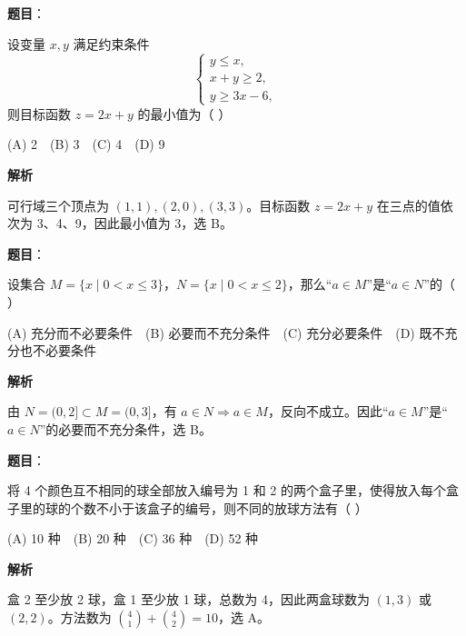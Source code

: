 \begin{answer}

\textbf{题目}：

设变量 \(x,y\) 满足约束条件
\nopagebreak[4]
\[
\begin{cases}
y\leq x,\\
x+y\geq 2,\\
y\geq 3x-6,
\end{cases}
\]
则目标函数 \(z=2x+y\) 的最小值为（  ）

(A) 2　(B) 3　(C) 4　(D) 9

\textbf{解析}

可行域三个顶点为 \((1,1),(2,0),(3,3)\)。目标函数 \(z=2x+y\) 在三点的值依次为 3、4、9，因此最小值为 3，选 B。


\end{answer}
\begin{answer}

\textbf{题目}：

设集合 \(M=\{x\mid 0<x\leq 3\}\)，\(N=\{x\mid 0<x\leq 2\}\)，那么“\(a\in M\)”是“\(a\in N\)”的（  ）

(A) 充分而不必要条件　(B) 必要而不充分条件　(C) 充分必要条件　(D) 既不充分也不必要条件

\textbf{解析}

由 \(N=(0,2]\subset M=(0,3]\)，有 \(a\in N\Rightarrow a\in M\)，反向不成立。因此“\(a\in M\)”是“\(a\in N\)”的必要而不充分条件，选 B。


\end{answer}
\begin{answer}

\textbf{题目}：

将 4 个颜色互不相同的球全部放入编号为 1 和 2 的两个盒子里，使得放入每个盒子里的球的个数不小于该盒子的编号，则不同的放球方法有（  ）

(A) 10 种　(B) 20 种　(C) 36 种　(D) 52 种

\textbf{解析}

盒 2 至少放 2 球，盒 1 至少放 1 球，总数为 4，因此两盒球数为 \((1,3)\) 或 \((2,2)\)。方法数为 \(\binom41+\binom42=10\)，选 A。


\end{answer}
